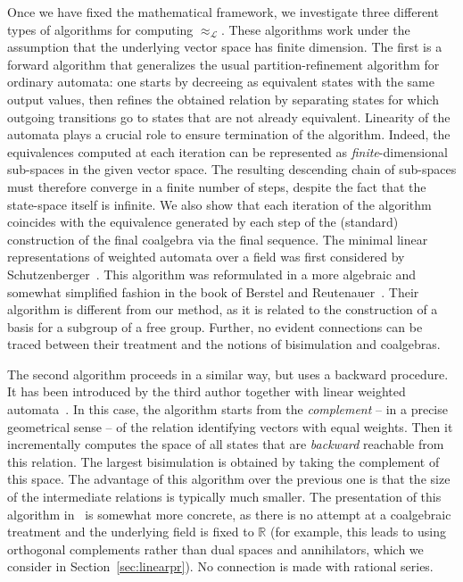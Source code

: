 \documentclass[3p]{elsarticle}
\newcommand{\fL}{\mathcal{L}}    %
\newcommand{\reals}{{\mathbb{R}}}              %
\begin{document}
Once we have fixed the mathematical framework, we investigate three different
types of  algorithms for computing $\approx_{\fL}$. These algorithms work under the
assumption that the underlying vector space has finite dimension. The first is a forward
algorithm that  generalizes the usual partition-refinement algorithm for ordinary automata:
one starts by decreeing as equivalent states with the same output values, then refines the obtained relation by separating
states for which outgoing transitions go to states that are not already
equivalent. Linearity of the automata plays a crucial role to ensure termination of the
algorithm. Indeed, the    equivalences computed at each iteration    can be represented
as \emph{finite}-dimensional sub-spaces in the given vector space.  The resulting
descending chain of sub-spaces must  therefore   converge in a finite number of steps,
despite the fact that the state-space itself is infinite. We also show that each
iteration of the algorithm coincides with the equivalence generated by each step of
the (standard) construction of the final coalgebra via the final sequence.
The minimal linear representations of weighted automata over a field
was first considered by Schutzenberger~\cite{Schutzenberger61b}. This algorithm was
reformulated in a more algebraic and somewhat simplified fashion in the book of Berstel and Reutenauer~\cite{BR-series}. Their algorithm is different from our method, as
it is related to the construction of a basis for a subgroup of a free group. Further, no
evident connections can be traced between their treatment  and the notions
of bisimulation and coalgebras.

The second algorithm proceeds in a similar way, but uses a backward procedure. It has been introduced
by the third author together with linear weighted automata~\cite{Bor09}.
In this case,  the algorithm starts from the \emph{complement} -- in a precise
geometrical sense -- of   the relation identifying vectors with
equal weights. Then  it  incrementally  computes the space of all
states that are \emph{backward} reachable from this relation. The largest
bisimulation is obtained by taking the complement  of this space.
The advantage of this algorithm over the previous one is that the size of the
intermediate relations is typically much smaller. The presentation of this algorithm
in~\cite{Bor09} is  somewhat more concrete, as there is no attempt at a
coalgebraic treatment and the underlying field is fixed to $\reals$ (for example,
this leads to using  orthogonal complements  rather than dual spaces and annihilators,
which we consider in Section~\ref{sec:linearpr}). No connection is made with rational series.
\end{document}
